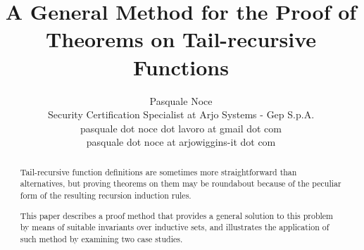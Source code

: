 \documentclass[11pt,a4paper]{article}
\begin{document}
\title{A General Method for the Proof of Theorems on Tail-recursive Functions}
\author{Pasquale Noce\\Security Certification Specialist at Arjo Systems - Gep S.p.A.\\pasquale dot noce dot lavoro at gmail dot com\\pasquale dot noce at arjowiggins-it dot com}
\maketitle

\begin{abstract}
  Tail-recursive function definitions are sometimes more straightforward than
  alternatives, but proving theorems on them may be roundabout because of the
  peculiar form of the resulting recursion induction rules.

  This paper describes a proof method that provides a general solution to this
  problem by means of suitable invariants over inductive sets, and illustrates
  the application of such method by examining two case studies.
\end{abstract}

\tableofcontents





\end{document}
